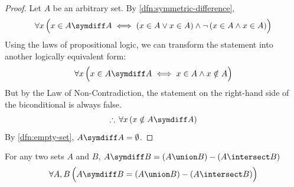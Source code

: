 \begin{proof}
    Let \( A \) be an arbitrary set. By \cref{dfn:symmetric-difference},
    \begin{equation*}
        \forall x \, \Big( x \in A \symdiff A \iff
        \mleft( x \in A \lor x \in A \mright) \land
        \lnot \, \mleft( x \in A \land x \in A \mright)\Big)
    \end{equation*}
    Using the laws of propositional logic, we can transform the statement into
    another logically equivalent form:
    \begin{equation*}
        \forall x \, \Big( x \in A \symdiff A \iff
        x \in A \land x \notin A \Big)
    \end{equation*}
    But by the Law of Non-Contradiction, the statement on the right-hand side of the biconditional is always false.
    \begin{equation*}
        \therefore \, \forall x \, \mleft( x \notin A \symdiff A \mright)
    \end{equation*}
    By \cref{dfn:empty-set}, \( A \symdiff A = \emptyset \).
\end{proof}

\begin{thm}
    \label{set-identities:symmetric-difference-in-terms-of-union-and-intersection}
    For any two sets \( A \) and \( B \), \( A \symdiff B = \mleft( A \union B \mright) - \mleft( A \intersect B \mright) \)
    \begin{equation*}
        \forall A,B \, \Big( A \symdiff B = \mleft( A \union B \mright) - \mleft( A \intersect B \mright) \Big)
    \end{equation*}
\end{thm}

